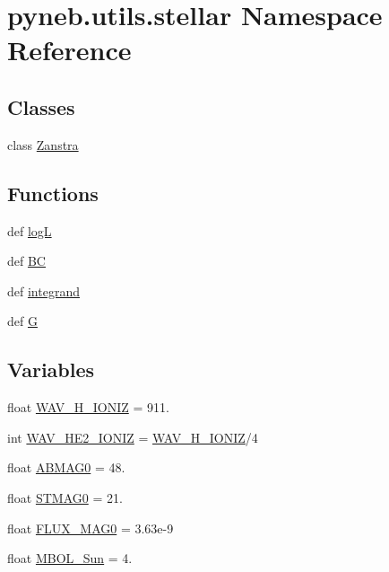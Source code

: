 \hypertarget{namespacepyneb_1_1utils_1_1stellar}{\section{pyneb.\-utils.\-stellar Namespace Reference}
\label{namespacepyneb_1_1utils_1_1stellar}
}
\subsection*{Classes}
\begin{DoxyCompactItemize}
\item 
class \hyperlink{classpyneb_1_1utils_1_1stellar_1_1_zanstra}{Zanstra}
\end{DoxyCompactItemize}
\subsection*{Functions}
\begin{DoxyCompactItemize}
\item 
def \hyperlink{namespacepyneb_1_1utils_1_1stellar_a1028b99ddfc374c050254672a26abda9}{log\-L}
\item 
def \hyperlink{namespacepyneb_1_1utils_1_1stellar_adb31507adc6104012e696b5d0b28b2cc}{B\-C}
\item 
def \hyperlink{namespacepyneb_1_1utils_1_1stellar_adf2a28268f7e69307f7b6c47920bcbb2}{integrand}
\item 
def \hyperlink{namespacepyneb_1_1utils_1_1stellar_ab168636a519c17879ce58df1188ddbe1}{G}
\end{DoxyCompactItemize}
\subsection*{Variables}
\begin{DoxyCompactItemize}
\item 
float \hyperlink{namespacepyneb_1_1utils_1_1stellar_afb8d2a4b14477b7097da285535eafc12}{W\-A\-V\-\_\-\-H\-\_\-\-I\-O\-N\-I\-Z} = 911.
\item 
int \hyperlink{namespacepyneb_1_1utils_1_1stellar_a1b0844f39c08a2b7289ad093042cf55e}{W\-A\-V\-\_\-\-H\-E2\-\_\-\-I\-O\-N\-I\-Z} = \hyperlink{namespacepyneb_1_1utils_1_1stellar_afb8d2a4b14477b7097da285535eafc12}{W\-A\-V\-\_\-\-H\-\_\-\-I\-O\-N\-I\-Z}/4
\item 
float \hyperlink{namespacepyneb_1_1utils_1_1stellar_a54ebf26e2af1a957afac5ce6db64de30}{A\-B\-M\-A\-G0} = 48.
\item 
float \hyperlink{namespacepyneb_1_1utils_1_1stellar_a53dc996c80c0bc5ee416b1fcbb8a6afc}{S\-T\-M\-A\-G0} = 21.
\item 
float \hyperlink{namespacepyneb_1_1utils_1_1stellar_ab52d6f24f3c66cb2d6ad7e52bd4b4cd6}{F\-L\-U\-X\-\_\-\-M\-A\-G0} = 3.\-63e-\/9
\item 
float \hyperlink{namespacepyneb_1_1utils_1_1stellar_ab677115958b6555a42963ed87adc1afc}{M\-B\-O\-L\-\_\-\-Sun} = 4.
\end{DoxyCompactItemize}


